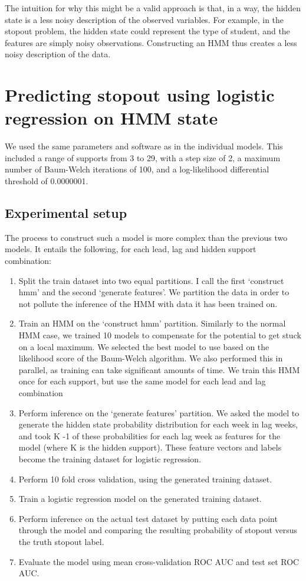 The intuition for why this might be a valid approach is that, in a way, the hidden state is a less noisy description of the observed variables. For example, in the stopout problem, the hidden state could represent the type of student, and the features are simply noisy observations. Constructing an HMM thus creates a less noisy description of the data. 

\section{Predicting stopout using logistic regression on HMM state}
We used the same parameters and software as in the individual models. This included a range of supports from 3 to 29, with a step size of 2, a maximum number of Baum-Welch iterations of 100, and a log-likelihood differential threshold of 0.0000001.

\subsection{Experimental setup}
The process to construct such a model is more complex than the previous two models. It entails the following, for each lead, lag and hidden support combination:
\begin{enumerate}
\item Split the train dataset into two equal partitions. I call the first `construct hmm' and the second `generate features'. We partition the data in order to not pollute the inference of the HMM with data it has been trained on.
\item Train an HMM on the `construct hmm' partition. Similarly to the normal HMM case, we trained 10 models to compensate for the potential to get stuck on a local maximum. We selected the best model to use based on the likelihood score of the Baum-Welch algorithm. We also performed this in parallel, as training can take significant amounts of time. We train this HMM once for each support, but use the same model for each lead and lag combination
\item Perform inference on the `generate features' partition. We asked the model to generate the hidden state probability distribution for each week in lag weeks, and took K -1 of these probabilities for each lag week as features for the model (where K is the hidden support). These feature vectors and labels become the training dataset for logistic regression.
\item Perform 10 fold cross validation, using the generated training dataset. 
\item Train a logistic regression model on the generated training dataset.
\item Perform inference on the actual test dataset by putting each data point through the model and comparing the resulting probability of stopout versus the truth stopout label.
\item Evaluate the model using mean cross-validation ROC AUC and test set ROC AUC.
\end{enumerate}

